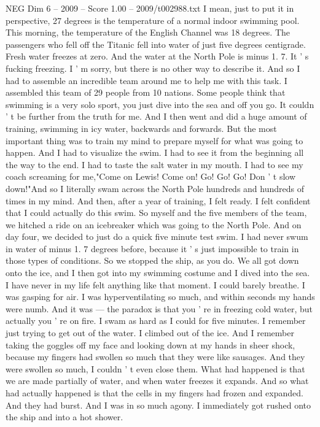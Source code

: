 \begin{textsample}{NEG Dim 6 – 2009 – Score 1.00 – 2009/t002988.txt}
I mean, just to put it in perspective, 27 degrees is the temperature of a normal indoor swimming pool.
This morning, the temperature of the English Channel was 18 degrees.
The passengers who fell off the Titanic fell into water of just five degrees centigrade.
Fresh water freezes at zero.
And the water at the North Pole is minus 1. 7.
It ' s fucking freezing.
I ' m sorry, but there is no other way to describe it.
And so I had to assemble an incredible team around me to help me with this task.
I assembled this team of 29 people from 10 nations.
Some people think that swimming is a very solo sport, you just dive into the sea and off you go.
It couldn ' t be further from the truth for me.
And I then went and did a huge amount of training, swimming in icy water, backwards and forwards.
But the most important thing was to train my mind to prepare myself for what was going to happen.
And I had to visualize the swim.
I had to see it from the beginning all the way to the end.
I had to taste the salt water in my mouth.
I had to see my coach screaming for me,"Come on Lewis!
Come on!
Go!
Go!
Go!
Don ' t slow down!"And so I literally swam across the North Pole hundreds and hundreds of times in my mind.
And then, after a year of training, I felt ready.
I felt confident that I could actually do this swim.
So myself and the five members of the team, we hitched a ride on an icebreaker which was going to the North Pole.
And on day four, we decided to just do a quick five minute test swim.
I had never swum in water of minus 1. 7 degrees before, because it ' s just impossible to train in those types of conditions.
So we stopped the ship, as you do.
We all got down onto the ice, and I then got into my swimming costume and I dived into the sea.
I have never in my life felt anything like that moment.
I could barely breathe.
I was gasping for air.
I was hyperventilating so much, and within seconds my hands were numb.
And it was — the paradox is that you ' re in freezing cold water, but actually you ' re on fire.
I swam as hard as I could for five minutes.
I remember just trying to get out of the water.
I climbed out of the ice.
And I remember taking the goggles off my face and looking down at my hands in sheer shock, because my fingers had swollen so much that they were like sausages.
And they were swollen so much, I couldn ' t even close them.
What had happened is that we are made partially of water, and when water freezes it expands.
And so what had actually happened is that the cells in my fingers had frozen and expanded.
And they had burst.
And I was in so much agony.
I immediately got rushed onto the ship and into a hot shower.

\end{textsample}
